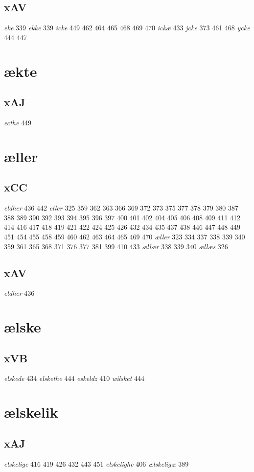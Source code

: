 \documentclass[a4paper,twocolumn]{article}
\begin{document}
\subsection{xAV}
\label{sec:org1ff36fe}
\emph{eke} 339 \emph{ekke} 339 \emph{icke} 449 462 464 465 468 469 470 \emph{ickæ} 433 \emph{jcke} 373 461 468 \emph{ycke} 444 447 
\section{ækte}
\label{sec:orgb00f934}
\subsection{xAJ}
\label{sec:org56f0f49}
\emph{ecthe} 449 
\section{æller}
\label{sec:org7d0ba29}
\subsection{xCC}
\label{sec:orgaa4dc22}
\emph{eldher} 436 442 \emph{eller} 325 359 362 363 366 369 372 373 375 377 378 379 380 387 388 389 390 392 393 394 395 396 397 400 401 402 404 405 406 408 409 411 412 414 416 417 418 419 421 422 424 425 426 432 434 435 437 438 446 447 448 449 451 454 455 458 459 460 462 463 464 465 469 470 \emph{æller} 323 334 337 338 339 340 359 361 365 368 371 376 377 381 399 410 433 \emph{ællær} 338 339 340 \emph{ællæs} 326 
\subsection{xAV}
\label{sec:orgf83ffc1}
\emph{eldher} 436 
\section{ælske}
\label{sec:org220374d}
\subsection{xVB}
\label{sec:orgb219b3b}
\emph{elskede} 434 \emph{elskethe} 444 \emph{eskeldz} 410 \emph{wilsket} 444 
\section{ælskelik}
\label{sec:orgfdb6e93}
\subsection{xAJ}
\label{sec:org143bbe1}
\emph{elskelige} 416 419 426 432 443 451 \emph{elskelighe} 406 \emph{ælskeligæ} 389 
\end{document}
